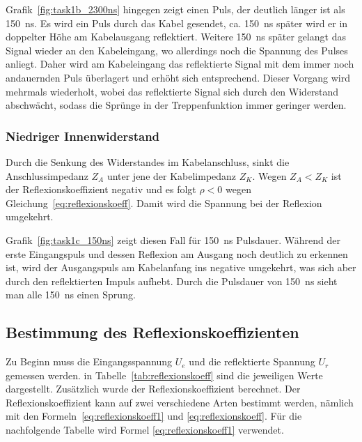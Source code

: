\documentclass{article}
\begin{document}
Grafik~\ref{fig:task1b_2300ns} hingegen zeigt einen Puls, der deutlich länger ist als 150~ns. Es wird ein Puls durch das Kabel gesendet, ca. 150~ns später wird er in doppelter Höhe am Kabelausgang reflektiert. Weitere 150~ns später gelangt das Signal wieder an den Kabeleingang, wo allerdings noch die Spannung des Pulses anliegt. Daher wird am Kabeleingang das reflektierte Signal mit dem immer noch andauernden Puls überlagert und erhöht sich entsprechend. Dieser Vorgang wird mehrmals wiederholt, wobei das reflektierte Signal sich durch den Widerstand abschwächt, sodass die Sprünge in der Treppenfunktion immer geringer werden. 


\subsubsection{Niedriger Innenwiderstand}

Durch die Senkung des Widerstandes im Kabelanschluss, sinkt die Anschlussimpedanz $Z_A$ unter jene der Kabelimpedanz $Z_K$. Wegen $Z_A < Z_K$ ist der Reflexionskoeffizient negativ und es folgt $\rho < 0$ wegen Gleichung~\eqref{eq:reflexionskoeff}. Damit wird die Spannung bei der Reflexion umgekehrt.

Grafik~\ref{fig:task1c_150ns} zeigt diesen Fall für 150~ns Pulsdauer. Während der erste Eingangspuls und dessen Reflexion am Ausgang noch deutlich zu erkennen ist, wird der Ausgangspuls am Kabelanfang ins negative umgekehrt, was sich aber durch den reflektierten Impuls aufhebt. Durch die Pulsdauer von 150~ns sieht man alle 150~ns einen Sprung.

\subsection{Bestimmung des Reflexionskoeffizienten}

Zu Beginn muss die Eingangsspannung $U_e$ und die reflektierte Spannung $U_r$ gemessen werden. in Tabelle~\ref{tab:reflexionskoeff} sind die jeweiligen Werte dargestellt. Zusätzlich wurde der Reflexionskoeffizient berechnet. Der Reflexionskoeffizient kann auf zwei verschiedene Arten bestimmt werden, nämlich mit den Formeln~\eqref{eq:reflexionskoeff1} und \eqref{eq:reflexionskoeff}. Für die nachfolgende Tabelle wird Formel \eqref{eq:reflexionskoeff1} verwendet.
\end{document}
